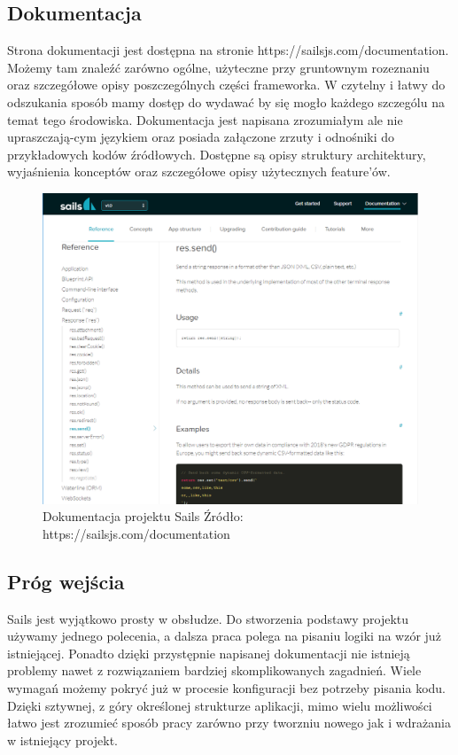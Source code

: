 \documentclass[12pt]{report}
\begin{document}
    \subsection{Dokumentacja}
      Strona dokumentacji jest dostępna na stronie https://sailsjs.com/documentation.
      Możemy tam znaleźć zarówno ogólne, użyteczne przy gruntownym rozeznaniu oraz szczegółowe opisy poszczególnych części frameworka.
      W czytelny i łatwy do odszukania sposób mamy dostęp do wydawać by się mogło każdego szczególu na temat tego środowiska.
      Dokumentacja jest napisana zrozumiałym ale nie upraszczają-cym językiem oraz posiada załączone zrzuty i odnośniki do przykładowych kodów źródłowych.
      Dostępne są opisy struktury architektury, wyjaśnienia konceptów oraz szczegółowe opisy użytecznych feature'ów.
      \begin{figure}[!hb]
        \centering
        \includegraphics[width=\textwidth,height=\textheight,keepaspectratio]{doc_sails.png} 
        \caption{Dokumentacja projektu Sails \newline Źródło: https://sailsjs.com/documentation}
      \end{figure}

    \subsection{Próg wejścia}
      Sails jest wyjątkowo prosty w obsłudze.
      Do stworzenia podstawy projektu używamy jednego polecenia, a dalsza praca polega na pisaniu logiki na wzór już istniejącej.
      Ponadto dzięki przystępnie napisanej dokumentacji nie istnieją problemy nawet z rozwiązaniem bardziej skomplikowanych zagadnień.
      Wiele wymagań możemy pokryć już w procesie konfiguracji bez potrzeby pisania kodu.
      Dzięki sztywnej, z góry określonej strukturze aplikacji, mimo wielu możliwości łatwo jest zrozumieć sposób pracy zarówno przy tworzniu nowego jak i wdrażania w istniejący projekt. 
\end{document}
